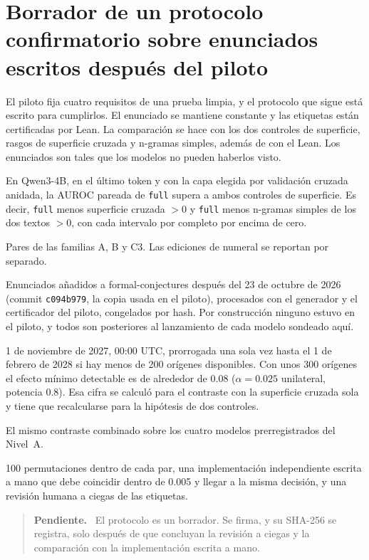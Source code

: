 \documentclass[10pt]{article}
\newcommand{\vr}[1]{\texttt{#1}}
\newenvironment{pendiente}{\begin{quote}\small\noindent\textbf{Pendiente.}\ }{\end{quote}}
\begin{document}
\section{Borrador de un protocolo confirmatorio sobre enunciados escritos después del piloto}\label{app:protocolo}

El piloto fija cuatro requisitos de una prueba limpia, y el protocolo que sigue está escrito para cumplirlos. El
enunciado se mantiene constante y las etiquetas están certificadas por Lean. La comparación se hace con los dos
controles de superficie, rasgos de superficie cruzada y n-gramas simples, además de con el Lean. Los enunciados son
tales que los modelos no pueden haberlos visto.

\begin{description}[leftmargin=1.2em]
\item[Hipótesis] En Qwen3-4B, en el último token y con la capa elegida por validación cruzada anidada, la AUROC
pareada de \vr{full} supera a ambos controles de superficie. Es decir, \vr{full} menos superficie cruzada $> 0$ y
\vr{full} menos n-gramas simples de los dos textos $> 0$, con cada intervalo por completo por encima de cero.
\item[Población] Pares de las familias A, B y C3. Las ediciones de numeral se reportan por separado.
\item[Datos] Enunciados añadidos a formal-conjectures después del 23 de octubre de 2026 (commit \vr{c094b979}, la copia usada en el piloto),
procesados con el generador y el certificador del piloto, congelados por hash. Por construcción ninguno estuvo en el
piloto, y todos son posteriores al lanzamiento de cada modelo sondeado aquí.
\item[Instantánea] 1 de noviembre de 2027, 00:00 UTC, prorrogada una sola vez hasta el 1 de febrero de 2028 si hay menos de 200 orígenes
disponibles. Con unos 300 orígenes el efecto mínimo detectable es de alrededor de 0.08 ($\alpha = 0.025$
unilateral, potencia 0.8). Esa cifra se calculó para el contraste con la superficie cruzada sola y tiene que
recalcularse para la hipótesis de dos controles.
\item[Réplica] El mismo contraste combinado sobre los cuatro modelos prerregistrados del Nivel~A.
\item[Verificaciones] 100 permutaciones dentro de cada par, una implementación independiente escrita a mano que debe
coincidir dentro de 0.005 y llegar a la misma decisión, y una revisión humana a ciegas de las etiquetas.
\end{description}

\begin{pendiente}
El protocolo es un borrador. Se firma, y su SHA-256 se registra, solo después de que concluyan la revisión a ciegas y
la comparación con la implementación escrita a mano.
\end{pendiente}

\end{document}
